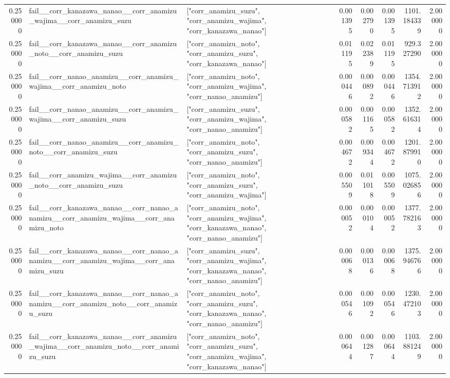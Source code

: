 \begin{tabular}{rllrrrrr}
0.250000 & fail\_\_corr\_kanazawa\_nanao\_\_corr\_anamizu\_wajima\_\_corr\_anamizu\_suzu & ["corr\_anamizu\_suzu", "corr\_anamizu\_wajima", "corr\_kanazawa\_nanao"] & 0.001395 & 0.002790 & 0.001395 & 1101.184339 & 2.000000 \\
0.250000 & fail\_\_corr\_kanazawa\_nanao\_\_corr\_anamizu\_noto\_\_corr\_anamizu\_suzu & ["corr\_anamizu\_noto", "corr\_anamizu\_suzu", "corr\_kanazawa\_nanao"] & 0.011195 & 0.022389 & 0.011195 & 929.327290 & 2.000000 \\
0.250000 & fail\_\_corr\_nanao\_anamizu\_\_corr\_anamizu\_wajima\_\_corr\_anamizu\_noto & ["corr\_anamizu\_noto", "corr\_anamizu\_wajima", "corr\_nanao\_anamizu"] & 0.000446 & 0.000892 & 0.000446 & 1354.713912 & 2.000000 \\
0.250000 & fail\_\_corr\_nanao\_anamizu\_\_corr\_anamizu\_wajima\_\_corr\_anamizu\_suzu & ["corr\_anamizu\_suzu", "corr\_anamizu\_wajima", "corr\_nanao\_anamizu"] & 0.000582 & 0.001165 & 0.000582 & 1352.616314 & 2.000000 \\
0.250000 & fail\_\_corr\_nanao\_anamizu\_\_corr\_anamizu\_noto\_\_corr\_anamizu\_suzu & ["corr\_anamizu\_noto", "corr\_anamizu\_suzu", "corr\_nanao\_anamizu"] & 0.004672 & 0.009344 & 0.004672 & 1201.879910 & 2.000000 \\
0.250000 & fail\_\_corr\_anamizu\_wajima\_\_corr\_anamizu\_noto\_\_corr\_anamizu\_suzu & ["corr\_anamizu\_noto", "corr\_anamizu\_suzu", "corr\_anamizu\_wajima"] & 0.005509 & 0.011018 & 0.005509 & 1075.026856 & 2.000000 \\
0.250000 & fail\_\_corr\_kanazawa\_nanao\_\_corr\_nanao\_anamizu\_\_corr\_anamizu\_wajima\_\_corr\_anamizu\_noto & ["corr\_anamizu\_noto", "corr\_anamizu\_wajima", "corr\_kanazawa\_nanao", "corr\_nanao\_anamizu"] & 0.000052 & 0.000104 & 0.000052 & 1377.782163 & 2.000000 \\
0.250000 & fail\_\_corr\_kanazawa\_nanao\_\_corr\_nanao\_anamizu\_\_corr\_anamizu\_wajima\_\_corr\_anamizu\_suzu & ["corr\_anamizu\_suzu", "corr\_anamizu\_wajima", "corr\_kanazawa\_nanao", "corr\_nanao\_anamizu"] & 0.000068 & 0.000136 & 0.000068 & 1375.946766 & 2.000000 \\
0.250000 & fail\_\_corr\_kanazawa\_nanao\_\_corr\_nanao\_anamizu\_\_corr\_anamizu\_noto\_\_corr\_anamizu\_suzu & ["corr\_anamizu\_noto", "corr\_anamizu\_suzu", "corr\_kanazawa\_nanao", "corr\_nanao\_anamizu"] & 0.000546 & 0.001092 & 0.000546 & 1230.472103 & 2.000000 \\
0.250000 & fail\_\_corr\_kanazawa\_nanao\_\_corr\_anamizu\_wajima\_\_corr\_anamizu\_noto\_\_corr\_anamizu\_suzu & ["corr\_anamizu\_noto", "corr\_anamizu\_suzu", "corr\_anamizu\_wajima", "corr\_kanazawa\_nanao"] & 0.000644 & 0.001287 & 0.000644 & 1103.881249 & 2.000000 \\

\end{tabular}
